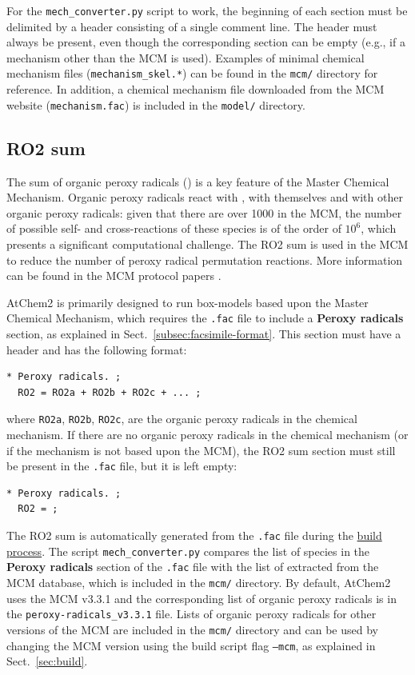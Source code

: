 For the \texttt{mech\_converter.py} script to work, the beginning of each section must be
delimited by a header consisting of a single comment line. The header must always be present,
even though the corresponding section can be empty (e.g., if a mechanism other than the MCM is
used). Examples of minimal chemical mechanism files (\texttt{mechanism\_skel.*}) can be found
in the \texttt{mcm/} directory for reference. In addition, a chemical mechanism file downloaded
from the MCM website (\texttt{mechanism.fac}) is included in the \texttt{model/} directory.

\subsection{RO2 sum} \label{subsec:ro2-sum}

The sum of organic peroxy radicals () is a key feature of the Master Chemical
Mechanism. Organic peroxy radicals react with , with themselves and with other organic
peroxy radicals: given that there are over 1000  in the MCM, the number of possible
self- and cross-reactions of these species is of the order of $10^6$, which presents a
significant computational challenge. The RO2 sum is used in the MCM to reduce the number of
peroxy radical permutation reactions. More information can be found in the MCM protocol papers
\citep{jenkin_1997, saunders_2003}.

AtChem2 is primarily designed to run box-models based upon the Master Chemical Mechanism, which
requires the \texttt{.fac} file to include a \textbf{Peroxy radicals} section, as explained in
Sect.~\ref{subsec:facsimile-format}. This section must have a header and has the following
format:

\begin{Verbatim}[fontsize=\small]
  * Peroxy radicals. ;
  RO2 = RO2a + RO2b + RO2c + ... ;
\end{Verbatim}

where \texttt{RO2a}, \texttt{RO2b}, \texttt{RO2c}, are the organic peroxy radicals in the
chemical mechanism. If there are no organic peroxy radicals in the chemical mechanism (or if
the mechanism is not based upon the MCM), the RO2 sum section must still be present in the
\texttt{.fac} file, but it is left empty:

\begin{Verbatim}[fontsize=\small]
  * Peroxy radicals. ;
  RO2 = ;
\end{Verbatim}

The RO2 sum is automatically generated from the \texttt{.fac} file during the
\hyperref[subsec:build-process]{build process}. The script \texttt{mech\_converter.py} compares
the list of species in the \textbf{Peroxy radicals} section of the \texttt{.fac} file with the
list of  extracted from the MCM database, which is included in the \texttt{mcm/}
directory. By default, AtChem2 uses the MCM v3.3.1 and the corresponding list of organic
peroxy radicals is in the \texttt{peroxy-radicals\_v3.3.1} file. Lists of organic peroxy
radicals for other versions of the MCM are included in the \texttt{mcm/} directory and can be
used by changing the MCM version using the build script flag \texttt{--mcm}, as explained in
Sect.~\ref{sec:build}.

